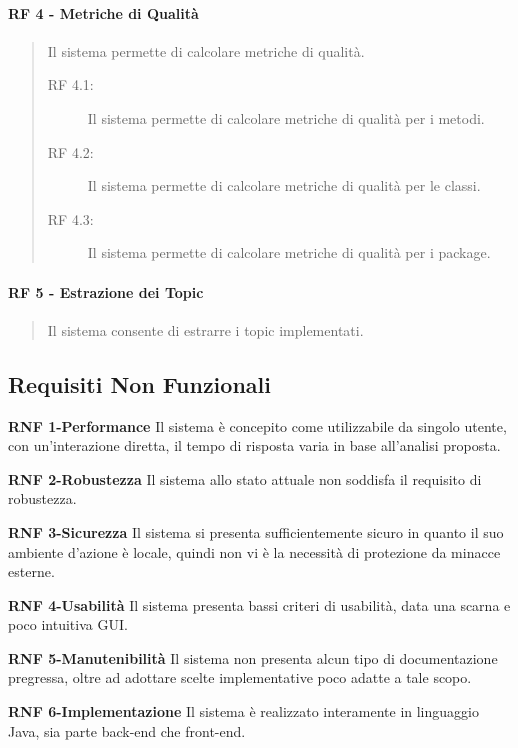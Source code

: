 	
			\paragraph{RF 4 - Metriche di Qualità} 
		\begin{quote}Il sistema permette di calcolare metriche di qualità.\begin{description}
				\item [RF 4.1:] Il sistema permette di calcolare metriche di qualità per i metodi.
				\item [RF 4.2:] Il sistema permette di calcolare metriche di qualità per le classi.
				\item [RF 4.3:] Il sistema permette di calcolare metriche di qualità per i package.
		\end{description}\end{quote}
	
			\paragraph{RF 5 - Estrazione dei Topic} 
		\begin{quote}Il sistema consente di estrarre i topic implementati.\end{quote}
			

		\subsection{Requisiti Non Funzionali}

\begin{list}{-}{}
	
	\item \textbf{RNF 1-Performance}\newline 
	Il sistema è concepito come utilizzabile da singolo utente, con un'interazione diretta, il tempo di risposta varia in base all'analisi proposta.
	 \newline 
	\item \textbf{RNF 2-Robustezza}
	\newline  Il sistema allo stato attuale non soddisfa il requisito di robustezza.
	\item \textbf{RNF 3-Sicurezza}
	\newline Il sistema si presenta sufficientemente sicuro in quanto il suo ambiente d'azione è locale, quindi non vi è la necessità di protezione da minacce esterne.
	\item \textbf{RNF 4-Usabilità}\newline 
	Il sistema presenta bassi criteri di usabilità, data una scarna e poco intuitiva GUI.
	\newline 
	\item \textbf{RNF 5-Manutenibilità}\newline 
	Il sistema non presenta alcun tipo di documentazione pregressa, oltre ad adottare scelte implementative poco adatte a tale scopo.
	\newline  
	\item \textbf{RNF 6-Implementazione}
	\newline Il sistema è realizzato interamente in linguaggio Java, sia parte back-end che front-end. 
\end{list}
	
